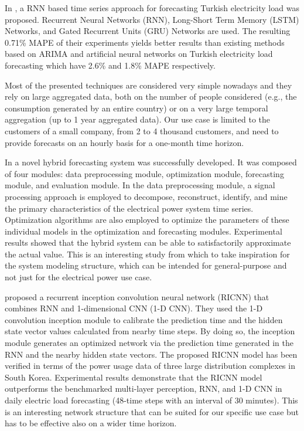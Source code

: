 In \cite{8404313}, a RNN based time series approach for forecasting Turkish electricity load was proposed.
Recurrent Neural Networks (RNN), Long-Short Term Memory (LSTM) Networks, and Gated Recurrent Units (GRU) Networks are used.
The resulting 0.71\% MAPE of their experiments yields better results than existing methods based on ARIMA and artificial neural networks on Turkish electricity load forecasting which have 2.6\% and 1.8\% MAPE respectively.

Most of the presented techniques are considered very simple nowadays and they rely on large aggregated data, both on the number of people considered (e.g., the consumption generated by an entire country) or on a very large temporal aggregation (up to 1 year aggregated data).
Our use case is limited to the customers of a small company, from 2 to 4 thousand customers, and need to provide forecasts on an hourly basis for a one-month time horizon.

In \cite{DU2018533} a novel hybrid forecasting system was successfully developed.
It was composed of four modules: data preprocessing module, optimization module, forecasting module, and evaluation module.
In the data preprocessing module, a signal processing approach is employed to decompose, reconstruct, identify, and mine the primary characteristics of the electrical power system time series.
Optimization algorithms are also employed to optimize the parameters of these individual models in the optimization and forecasting modules.
Experimental results showed that the hybrid system can be able to satisfactorily approximate the actual value.
This is an interesting study from which to take inspiration for the system modeling structure, which can be intended for general-purpose and not just for the electrical power use case.

\cite{KIM2019328} proposed a recurrent inception convolution neural network (RICNN) that combines RNN and 1-dimensional CNN (1-D CNN).
They used the 1-D convolution inception module to calibrate the prediction time and the hidden state vector values calculated from nearby time steps.
By doing so, the inception module generates an optimized network via the prediction time generated in the RNN and the nearby hidden state vectors.
The proposed RICNN model has been verified in terms of the power usage data of three large distribution complexes in South Korea.
Experimental results demonstrate that the RICNN model outperforms the benchmarked multi-layer perception, RNN, and 1-D CNN in daily electric load forecasting (48-time steps with an interval of 30 minutes).
This is an interesting network structure that can be suited for our specific use case but has to be effective also on a wider time horizon.

